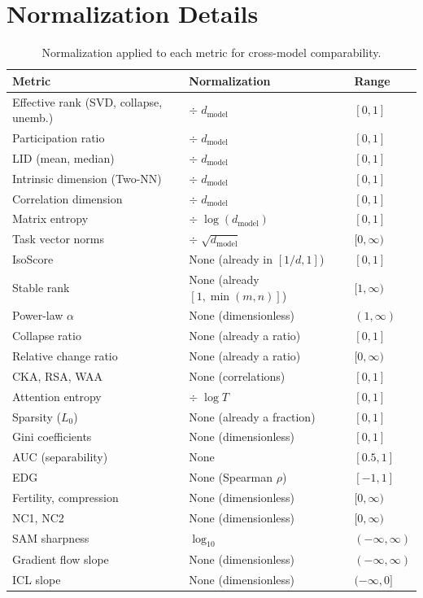 \documentclass{article}
\begin{document}
\section{Normalization Details}
\label{app:normalization}

\begin{table}[h]
\centering
\caption{Normalization applied to each metric for cross-model comparability.}
\label{tab:normalization}
\small
\begin{tabular}{@{}lll@{}}
\toprule
\textbf{Metric} & \textbf{Normalization} & \textbf{Range} \\
\midrule
Effective rank (SVD, collapse, unemb.) & $\div\; d_{\text{model}}$ & $[0, 1]$ \\
Participation ratio & $\div\; d_{\text{model}}$ & $[0, 1]$ \\
LID (mean, median) & $\div\; d_{\text{model}}$ & $[0, 1]$ \\
Intrinsic dimension (Two-NN) & $\div\; d_{\text{model}}$ & $[0, 1]$ \\
Correlation dimension & $\div\; d_{\text{model}}$ & $[0, 1]$ \\
Matrix entropy & $\div\; \log(d_{\text{model}})$ & $[0, 1]$ \\
Task vector norms & $\div\; \sqrt{d_{\text{model}}}$ & $[0, \infty)$ \\
\midrule
IsoScore & None (already in $[1/d, 1]$) & $[0, 1]$ \\
Stable rank & None (already $[1, \min(m,n)]$) & $[1, \infty)$ \\
Power-law $\alpha$ & None (dimensionless) & $(1, \infty)$ \\
Collapse ratio & None (already a ratio) & $[0, 1]$ \\
Relative change ratio & None (already a ratio) & $[0, \infty)$ \\
CKA, RSA, WAA & None (correlations) & $[0, 1]$ \\
Attention entropy & $\div\; \log T$ & $[0, 1]$ \\
Sparsity ($L_0$) & None (already a fraction) & $[0, 1]$ \\
Gini coefficients & None (dimensionless) & $[0, 1]$ \\
AUC (separability) & None & $[0.5, 1]$ \\
EDG & None (Spearman $\rho$) & $[-1, 1]$ \\
Fertility, compression & None (dimensionless) & $[0, \infty)$ \\
NC1, NC2 & None (dimensionless) & $[0, \infty)$ \\
SAM sharpness & $\log_{10}$ & $(-\infty, \infty)$ \\
Gradient flow slope & None (dimensionless) & $(-\infty, \infty)$ \\
ICL slope & None (dimensionless) & $(-\infty, 0]$ \\
\bottomrule
\end{tabular}
\end{table}
\end{document}

